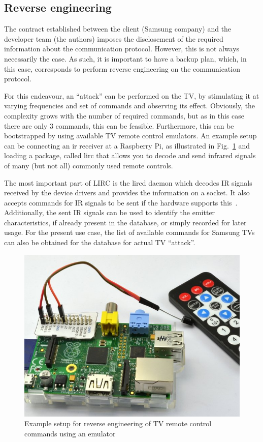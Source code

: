 \subsection{Reverse engineering}
\label{sec:reverse-engineering}
The contract established between the client (Samsung company) and the developer
team (the authors) imposes the disclosement of the required information about
the communication protocol. However, this is not always necessarily the case. As
such, it is important to have a backup plan, which, in this case, corresponds to
perform reverse engineering on the communication protocol.

For this endeavour, an ``attack'' can be performed on the TV, by stimulating it
at varying frequencies and set of commands and observing its effect. Obviously,
the complexity grows with the number of required commands, but as in this case
there are only 3 commands, this can be feasible. Furthermore, this can be
bootstrapped by using available TV remote control emulators. An example setup
can be connecting an \gls{ir} receiver at a Raspberry Pi, as illustrated in
Fig.~\ref{fig:rasp-lirc} and loading a package, called \gls{lirc} that allows you to decode and send infrared signals of many (but not all) commonly used remote controls.

The most important part of LIRC is the lircd daemon which decodes IR signals
received by the device drivers and provides the information on a socket. It also
accepts commands for IR signals to be sent if the hardware supports
this~\cite{lirc}. Additionally, the sent IR signals can be used to identify the
emitter characteristics, if already present in the database, or simply recorded
for later usage. For the present use case, the list of available commands for
Samsung TVs can also be obtained for the database for actual TV ``attack''.
%
  \vspace{-5mm}
%  
%
\begin{figure}[htb!]
\centering
    \includegraphics[width=0.43\columnwidth]{./img/rasp-reverse-engineering-setup.jpg}
  \caption{Example setup for reverse engineering of TV remote control commands
    using an emulator~\cite{rasp-lirc}}%
\label{fig:rasp-lirc}
\end{figure}

